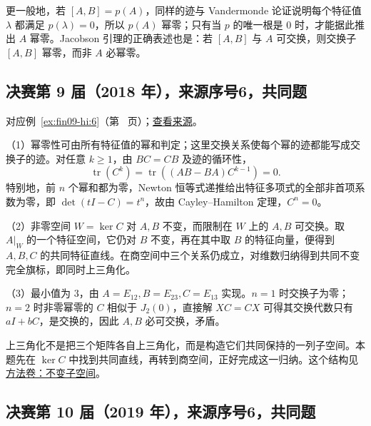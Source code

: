 \documentclass[12pt,fontset=fandol]{ctexart}
\begin{document}
\begin{remark}[方法与条件]

更一般地，若 $[A,B]=p(A)$，同样的迹与 Vandermonde 论证说明每个特征值 $\lambda$ 都满足 $p(\lambda)=0$，所以 $p(A)$ 幂零；只有当 $p$ 的唯一根是 $0$ 时，才能据此推出 $A$ 幂零。Jacobson 引理的正确表述也是：若 $[A,B]$ 与 $A$ 可交换，则交换子 $[A,B]$ 幂零，而非 $A$ 必幂零。

\end{remark}

\subsection{决赛第 9 届（2018 年），来源序号6，共同题}\label{ans:fin09-hi:6}\label{pr:fin09-hi:6}

对应例~\ref{ex:fin09-hi:6}（第~\pageref{ex:fin09-hi:6} 页）；\href{https://github.com/lzxcr/cmc-mathematics/blob/64916fa1fdbc3e444a652eca204d5669058ee321/src/problems/finals/09/06.md}{查看来源}。

\begin{solve}

（1）幂零性可由所有特征值的幂和判定；这里交换关系使每个幂的迹都能写成交换子的迹。对任意 $k\geq1$，由 $BC=CB$ 及迹的循环性，
\[
\operatorname{tr}(C^k)=\operatorname{tr}((AB-BA)C^{k-1})=0.
\]
特别地，前 $n$ 个幂和都为零，Newton 恒等式递推给出特征多项式的全部非首项系数为零，即 $\det(tI-C)=t^n$，故由 Cayley--Hamilton 定理，$C^n=0$。

（2）非零空间 $W=\ker C$ 对 $A,B$ 不变，而限制在 $W$ 上的 $A,B$ 可交换。取 $A|_W$ 的一个特征空间，它仍对 $B$ 不变，再在其中取 $B$ 的特征向量，便得到 $A,B,C$ 的共同特征直线。在商空间中三个关系仍成立，对维数归纳得到共同不变完全旗标，即同时上三角化。

（3）最小值为 $3$，由 $A=E_{12},B=E_{23},C=E_{13}$ 实现。$n=1$ 时交换子为零；$n=2$ 时非零幂零的 $C$ 相似于 $J_2(0)$，直接解 $XC=CX$ 可得其交换代数只有 $aI+bC$，是交换的，因此 $A,B$ 必可交换，矛盾。

\end{solve}

\begin{remark}[方法与条件]

上三角化不是把三个矩阵各自上三角化，而是构造它们共同保持的一列子空间。本题先在 $\ker C$ 中找到共同直线，再转到商空间，正好完成这一归纳。这个结构见\hyperref[app:linear-invariant]{方法卷：不变子空间}。

\end{remark}

\subsection{决赛第 10 届（2019 年），来源序号6，共同题}\label{ans:fin10-hi:6}\label{pr:fin10-hi:6}
\end{document}
